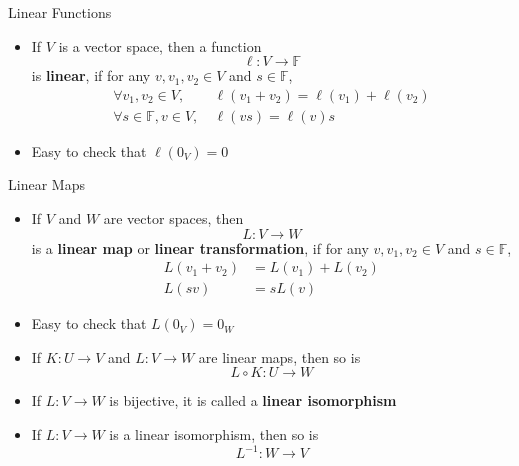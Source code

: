 \documentclass[usenames,dvipsnames,10pt]{beamer}
\newcommand\F{\mathbb{F}}
\begin{document}
\begin{frame}
  {Linear Functions}

  \begin{itemize}
  \item If $V$ is a vector space, then a function
    \[ \ell: V \rightarrow \F \]
    is {\bf linear}, if for any $v, v_1, v_2 \in V$ and $s \in \F$,
    \begin{align*}
      \forall v_1, v_2 \in V,\ &\ell(v_1+v_2) = \ell(v_1) + \ell(v_2)\\
      \forall s \in \F, v \in V,\ &\ell(vs) = \ell(v)s
    \end{align*}
  \item Easy to check that $\ell(0_V) = 0$
  \end{itemize}
\end{frame}

\begin{frame}
  {Linear Maps}

  \begin{itemize}
  \item If $V$ and $W$ are vector spaces, then
    \[ L: V \rightarrow W \]
    is a {\bf linear map} or {\bf linear transformation}, if for any $v, v_1, v_2 \in V$ and $s \in \F$,
    \begin{align*}
      L(v_1+v_2) &= L(v_1) + L(v_2)\\
      L(sv) &= sL(v)
    \end{align*}
  \item Easy to check that $L(0_V) = 0_W$
  \item If $K: U \rightarrow V$ and $L: V \rightarrow W$ are linear maps, then so is
    \[ L\circ K: U \rightarrow W \]
  \item If $L: V \rightarrow W$ is bijective, it is called a {\bf linear isomorphism}
  \item If $L: V \rightarrow W$ is a linear isomorphism, then so is
    \[ L^{-1}: W \rightarrow V \]
  \end{itemize}
\end{frame}
\end{document}
